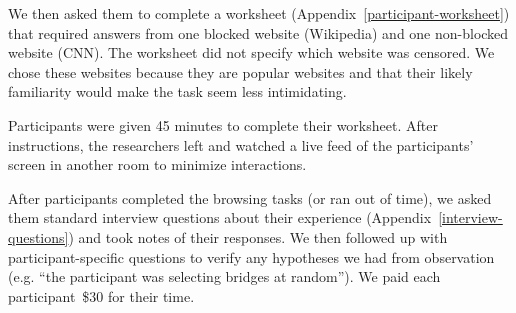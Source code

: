 \documentclass[USenglish,oneside,twocolumn]{article}
\begin{document}
We then asked them to complete a worksheet (Appendix~\ref{participant-worksheet}) that 
required answers from one blocked website (Wikipedia) and one non-blocked website (CNN).
The worksheet did not specify which website was censored. 
We chose these websites because they are popular websites and that their likely familiarity 
would make the task seem less intimidating. 

Participants were given 45 minutes to complete their worksheet. 
After instructions, the researchers left and watched a live feed of the participants' screen in another room to minimize interactions.

After participants completed the browsing tasks (or ran out of time),
we asked them standard interview questions about their experience (Appendix~\ref{interview-questions}) and took notes of their responses. We then followed up with participant-specific questions to verify any hypotheses we had from observation (e.g. ``the participant was selecting bridges at random''). We paid each participant~\$30 for their time. 
\end{document}
